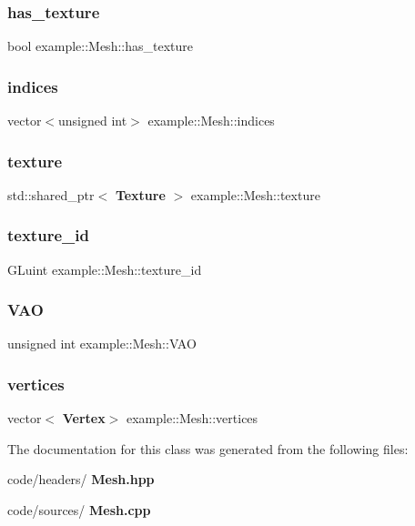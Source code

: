 \subsubsection{has\_texture}
{\footnotesize\ttfamily bool example\+::\+Mesh\+::has\+\_\+texture}

\mbox{\label{classexample_1_1_mesh_a2df64ef7da1d62b1cf6618f1d7d12073}} 
\subsubsection{indices}
{\footnotesize\ttfamily vector$<$unsigned int$>$ example\+::\+Mesh\+::indices}

\mbox{\label{classexample_1_1_mesh_aaed6ea206d64d657ed86201474a3da68}} 
\subsubsection{texture}
{\footnotesize\ttfamily std\+::shared\+\_\+ptr$<$ \textbf{ Texture} $>$ example\+::\+Mesh\+::texture}

\mbox{\label{classexample_1_1_mesh_a1ad1b235b81b5474da3a82f9f78c9c8d}} 
\subsubsection{texture\_id}
{\footnotesize\ttfamily G\+Luint example\+::\+Mesh\+::texture\+\_\+id}

\mbox{\label{classexample_1_1_mesh_ac92c034ccc6c26bf29aa89a0f69a6dbe}} 
\subsubsection{VAO}
{\footnotesize\ttfamily unsigned int example\+::\+Mesh\+::\+V\+AO}

\mbox{\label{classexample_1_1_mesh_ac6b4c018daf446724540ebd0529c20a5}} 
\subsubsection{vertices}
{\footnotesize\ttfamily vector$<$\textbf{ Vertex}$>$ example\+::\+Mesh\+::vertices}



The documentation for this class was generated from the following files\+:\begin{DoxyCompactItemize}
\item 
code/headers/\textbf{ Mesh.\+hpp}\item 
code/sources/\textbf{ Mesh.\+cpp}\end{DoxyCompactItemize}
